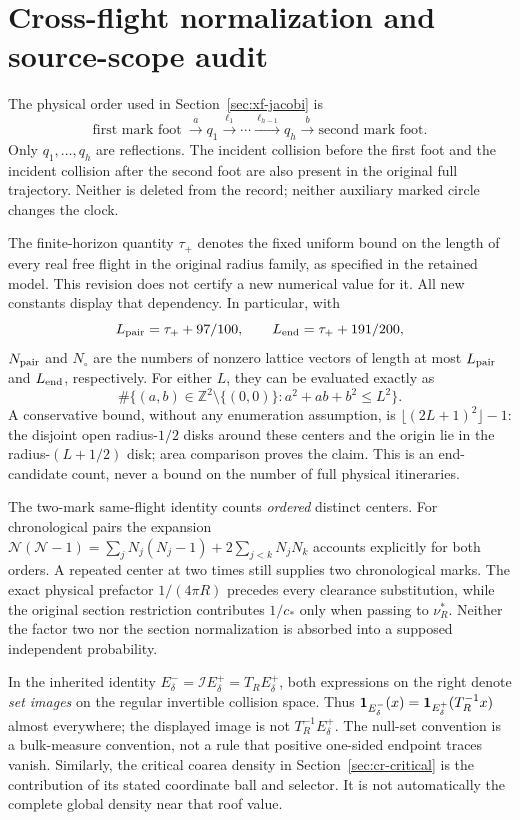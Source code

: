 \section{Cross-flight normalization and source-scope audit}
\label{sec:xf-audit}
The physical order used in Section~\ref{sec:xf-jacobi} is
\[
 \text{first mark foot}\ \xrightarrow{\ a\ }q_1
 \xrightarrow{\ \ell_1\ }\cdots
 \xrightarrow{\ \ell_{h-1}\ }q_h
 \xrightarrow{\ b\ }\text{second mark foot}.
\]
Only $q_1,\ldots,q_h$ are reflections. The incident collision before
the first foot and the incident collision after the second foot are
also present in the original full trajectory. Neither is deleted from
the record; neither auxiliary marked circle changes the clock.

The finite-horizon quantity $\tau_+$ denotes the fixed uniform bound
on the length of every real free flight in the original radius family,
as specified in the retained model. This revision does not certify a
new numerical value for it. All new constants display that dependency.
In particular, with
\[
 L_{\rm pair}=\tau_++97/100,\qquad
 L_{\rm end}=\tau_++191/200,
\]
$N_{\rm pair}$ and $N_\circ$ are the numbers of nonzero lattice
vectors of length at most $L_{\rm pair}$ and $L_{\rm end}$,
respectively. For either $L$, they can be evaluated exactly as
\[
 \#\{(a,b)\in\mathbb Z^2\setminus\{(0,0)\}:
                                      a^2+ab+b^2\le L^2\}.
\]
A conservative bound, without any enumeration assumption, is
$\lfloor(2L+1)^2\rfloor-1$: the disjoint open radius-$1/2$ disks
around these centers and the origin lie in the radius-$(L+1/2)$ disk;
area comparison proves the claim. This is an end-candidate count,
never a bound on the number of full physical itineraries.

The two-mark same-flight identity counts \emph{ordered} distinct
centers. For chronological pairs the expansion
$\mathscr N(\mathscr N-1)=\sum_jN_j(N_j-1)+2\sum_{j<k}N_jN_k$
accounts explicitly for both orders. A repeated center at two times
still supplies two chronological marks. The exact physical prefactor
$1/(4\pi R)$ precedes every clearance substitution, while the original
section restriction contributes $1/c_*$ only when passing to
$\nu_R^*$. Neither the factor two nor the section normalization is
absorbed into a supposed independent probability.

In the inherited identity
$E_\delta^-=\mathcal I E_\delta^+=T_RE_\delta^+$,
both expressions on the right denote \emph{set images} on the
regular invertible collision space. Thus
$\mathbf1_{E_\delta^-}(x)=\mathbf1_{E_\delta^+}(T_R^{-1}x)$ almost
everywhere; the displayed image is not $T_R^{-1}E_\delta^+$.
The null-set convention is a bulk-measure convention, not a rule that
positive one-sided endpoint traces vanish. Similarly, the critical
coarea density in Section~\ref{sec:cr-critical} is the contribution
of its stated coordinate ball and selector. It is not automatically
the complete global density near that roof value.

